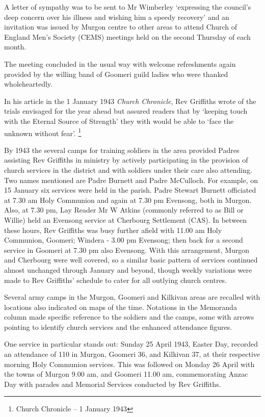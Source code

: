 A letter of sympathy was to be sent to Mr Wimberley `expressing the council's deep concern over his illness and wishing him a speedy recovery' and an invitation was issued by Murgon centre to other areas to attend Church of England Men's Society (CEMS) meetings held on the second Thursday of each month.



The meeting concluded in the usual way with welcome refreshments again provided by the willing band of Goomeri guild ladies who were thanked wholeheartedly.



In his article in the 1 January 1943 \emph{Church Chronicle}, Rev Griffiths wrote of the trials envisaged for the year ahead but assured readers that by `keeping touch with the Eternal Source of Strength' they with would be able to `face the unknown without fear'. \footnote{Church Chronicle -- 1 January 1943}


By 1943 the several camps for training soldiers in the area provided Padres assisting Rev Griffiths in ministry by actively participating in the provision of church services in the district and with soldiers under their care also attending. Two names mentioned are Padre Burnett and Padre McCulloch. For example, on 15 January six services were held in the parish. Padre Stewart Burnett officiated at 7.30 am Holy Communion and again at 7.30 pm Evensong, both in Murgon. Also, at 7.30 pm, Lay Reader Mr W Atkins (commonly referred to as Bill or Willie) held an Evensong service at Cherbourg Settlement (CAS). In between these hours, Rev Griffiths was busy further afield with 11.00 am Holy Communion, Goomeri; Windera - 3.00 pm Evensong; then back for a second service in Goomeri at 7.30 pm also Evensong. With this arrangement, Murgon and Cherbourg were well covered, so a similar basic pattern of services continued almost unchanged through January and beyond, though weekly variations were made to Rev Griffiths' schedule to cater for all outlying church centres.



Several army camps in the Murgon, Goomeri and Kilkivan areas are recalled with locations also indicated on maps of the time. Notations in the Memoranda column made specific reference to the soldiers and the camps, some with arrows pointing to identify church services and the enhanced attendance figures.



One service in particular stands out: Sunday 25 April 1943, Easter Day, recorded an attendance of 110 in Murgon, Goomeri 36, and Kilkivan 37, at their respective morning Holy Communion services. This was followed on Monday 26 April with the towns of Murgon 9.00 am, and Goomeri 11.00 am, commemorating Anzac Day with parades and Memorial Services conducted by Rev Griffiths.



